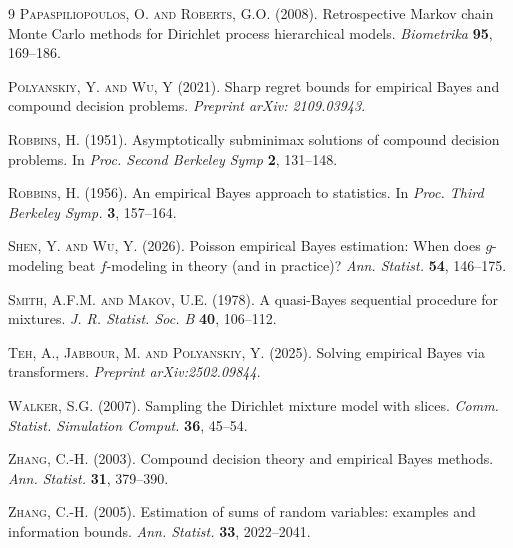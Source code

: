 \documentclass[twoside,12pt]{article}
\begin{document}
\begin{thebibliography}{9}
\textsc{Papaspiliopoulos, O. and Roberts, G.O.} (2008). Retrospective Markov chain Monte Carlo methods for Dirichlet process hierarchical models. \textit{Biometrika} \textbf{95}, 169--186.

\textsc{Polyanskiy, Y. and Wu, Y} (2021). Sharp regret bounds for empirical Bayes and compound decision problems. \textit{Preprint arXiv: 2109.03943}.

\textsc{Robbins, H.} (1951). Asymptotically subminimax solutions of compound decision problems. In \textit{Proc. Second Berkeley Symp} \textbf{2}, 131--148.

\textsc{Robbins, H.} (1956). An empirical Bayes approach to statistics. In \textit{Proc. Third Berkeley Symp.} \textbf{3}, 157--164.

\textsc{Shen, Y. and Wu, Y.} (2026). Poisson empirical Bayes estimation: When does $g$-modeling beat $f$-modeling in theory (and in practice)? \textit{Ann. Statist.} \textbf{54}, 146--175.

\textsc{Smith, A.F.M. and Makov, U.E.} (1978). A quasi-Bayes sequential procedure for mixtures. \textit{J. R. Statist. Soc. B} \textbf{40}, 106--112.

\textsc{Teh, A., Jabbour, M. and Polyanskiy, Y.} (2025). Solving empirical Bayes via transformers. \textit{Preprint arXiv:2502.09844}.

\textsc{Walker, S.G.} (2007). Sampling the Dirichlet mixture model with slices. \textit{Comm. Statist. Simulation Comput.} \textbf{36}, 45--54.

\textsc{Zhang, C.-H.} (2003). Compound decision theory and empirical Bayes methods. \textit{Ann. Statist.} \textbf{31}, 379--390.

\textsc{Zhang, C.-H.} (2005). Estimation of sums of random variables: examples and information bounds. \textit{Ann. Statist.} \textbf{33}, 2022--2041.

\end{thebibliography}


\newpage
\end{document}
